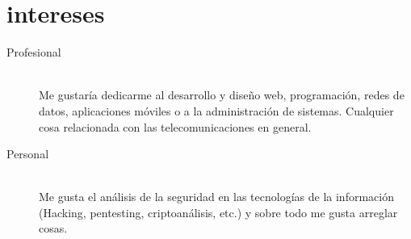 \documentclass[hidelinks]{friggeri-cv} %
\begin{document}
\section{intereses}

\begin{description}
  \item[Profesional] \hfill \\
Me gustaría dedicarme al desarrollo y diseño web, programación, redes de datos, aplicaciones
móviles o a la administración de sistemas. Cualquier cosa relacionada con las telecomunicaciones
en general.

\item[Personal] \hfill \\
Me gusta el análisis de la seguridad en las tecnologías de la información
(Hacking, pentesting, criptoanálisis, etc.) y sobre todo me gusta arreglar cosas.
\end{description}




\end{document}
